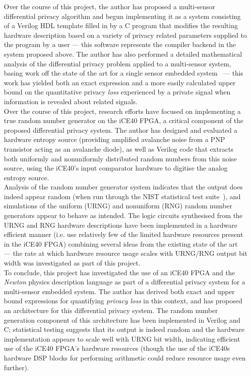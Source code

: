\documentclass[12pt]{article}
\begin{document}
Over the course of this project, the author has proposed a multi-sensor differential privacy algorithm and begun implementing it as a system consisting of a Verilog HDL template filled in by a C program that modifies the resulting hardware description based on a variety of privacy related parameters supplied to the program by a user --- this software represents the compiler backend in the system proposed above. The author has also performed a detailed mathematical analysis of the differential privacy problem applied to a multi-sensor system, basing work off the state of the art for a single sensor embedded system~\cite{Choi2018GuaranteeingLD} --- this work has yielded both an exact expression and a more easily calculated upper bound on the quantitative privacy \textit{loss} experienced by a private signal when information is revealed about related signals.\\

Over the course of this project, research efforts have focused on implementing a true random number generator on the iCE40 FPGA, a critical component of the proposed differential privacy system. The author has designed and evaluated a hardware entropy source (providing amplified avalanche noise from a PNP transistor acting as an avalanche diode), as well as Verilog code that extracts both uniformly and nonuniformly distributed random numbers from this noise source, using the iCE40's input comparator hardware to digitise the analog entropy source.\\

Analysis of the random number generator system indicates that the output does indeed appear random (when run through the NIST statistical test suite\cite{nist_test_suite}~\cite{arcetri_sts}), and simulations of the uniform (URNG) and nonuniform (RNG) random number generators appear to behave as intended. The logic circuits synthesised from the URNG and RNG hardware descriptions have been implemented in a hardware efficient manner (i.e. use relatively few of the limited hardware resources present in the iCE40 FPGA) combining several ideas from the existing state of the art~\cite{DeSchryver}~\cite{clz} --- the rate at which hardware resource usage scales with URNG/RNG output bit width was investigated as part of this project.\\

To conclude, this project has investigated the use of an iCE40 FPGA and the \textit{Newton} physics description language as part of a differential privacy system for a multi-sensor embedded system. The author has derived both exact and upper bound expressions for quantifying \textit{privacy loss} in this context, and has proposed an architecture for this differential privacy system. The random number generation component of this architecture has been implemented in Verilog and C; statistical testing suggests that its output is indeed random and the hardware implementation appears to scale well with URNG bit width, indicating efficient use of the iCE40 FPGA's hardware resources (though the use of the iCE40s hardware DSP blocks for performing arithmetic could reduce resource usage even further).
\end{document}
